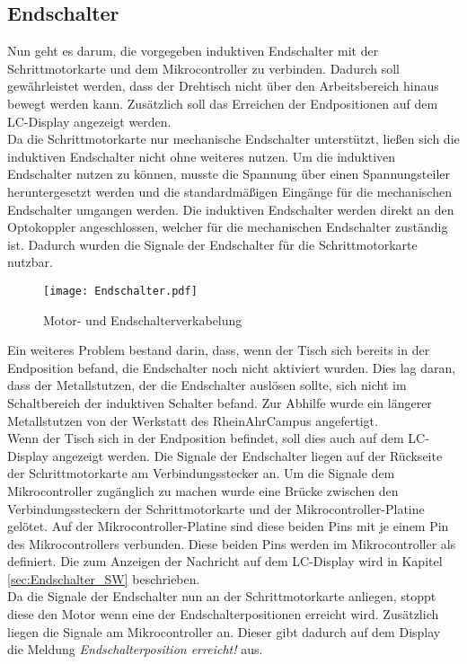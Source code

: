 \subsection{Endschalter}
Nun geht es darum, die vorgegeben induktiven Endschalter mit der Schrittmotorkarte und dem Mikrocontroller zu verbinden. Dadurch soll gewährleistet werden, dass der Drehtisch nicht über den Arbeitsbereich hinaus bewegt werden kann. Zusätzlich soll das Erreichen der Endpositionen auf dem LC-Display angezeigt werden.\\
Da die Schrittmotorkarte nur mechanische Endschalter unterstützt, ließen sich die induktiven Endschalter nicht ohne weiteres nutzen. Um die induktiven Endschalter nutzen zu können, musste die Spannung über einen Spannungsteiler heruntergesetzt werden und die standardmäßigen Eingänge für die mechanischen Endschalter umgangen werden. Die induktiven Endschalter werden direkt an den Optokoppler angeschlossen, welcher für die mechanischen Endschalter zuständig ist. Dadurch wurden die Signale der Endschalter für die Schrittmotorkarte nutzbar.
\begin{figure}[h]
\centering
\texttt{[image: Endschalter.pdf]}
\caption{Motor- und Endschalterverkabelung}
\label{fig:Motorverkabelung}
\end{figure}
Ein weiteres Problem bestand darin, dass, wenn der Tisch sich bereits in der Endposition befand, die Endschalter noch nicht aktiviert wurden. Dies lag daran, dass der Metallstutzen, der die Endschalter auslösen sollte, sich nicht im Schaltbereich der induktiven Schalter befand. Zur Abhilfe wurde ein längerer Metallstutzen von der Werkstatt des RheinAhrCampus angefertigt.\\
Wenn der Tisch sich in der Endposition befindet, soll dies auch auf dem LC-Display angezeigt werden. Die Signale der Endschalter liegen auf der Rückseite der Schrittmotorkarte am Verbindungsstecker an. Um die Signale dem Mikrocontroller zugänglich zu machen wurde eine Brücke zwischen den Verbindungssteckern der Schrittmotorkarte und der Mikrocontroller-Platine gelötet. Auf der Mikrocontroller-Platine sind diese beiden Pins mit je einem Pin des Mikrocontrollers verbunden. Diese beiden Pins werden im Mikrocontroller als  definiert. Die  zum Anzeigen der Nachricht auf dem LC-Display wird in Kapitel \ref{sec:Endschalter_SW} beschrieben.\\
Da die Signale der Endschalter nun an der Schrittmotorkarte anliegen, stoppt diese den Motor wenn eine der Endschalterpositionen erreicht wird. Zusätzlich liegen die Signale am Mikrocontroller an. Dieser gibt dadurch auf dem Display die Meldung \emph{Endschalterposition erreicht!} aus.

